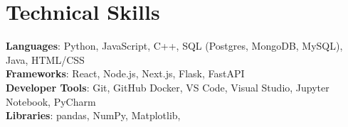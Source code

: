 \documentclass[letterpaper,11pt]{article}
\begin{document}
%
\section{Technical Skills}
 \begin{itemize}[leftmargin=0.15in, label={}]
    \small{\item{
     \textbf{Languages}{: Python, JavaScript, C++, SQL (Postgres, MongoDB, MySQL), Java, HTML/CSS} \\
     \textbf{Frameworks}{: React, Node.js, Next.js, Flask, FastAPI} \\
     \textbf{Developer Tools}{: Git, GitHub Docker, VS Code, Visual Studio, Jupyter Notebook, PyCharm } \\
     \textbf{Libraries}{: pandas, NumPy, Matplotlib, }
    }}
 \end{itemize}


\end{document}
